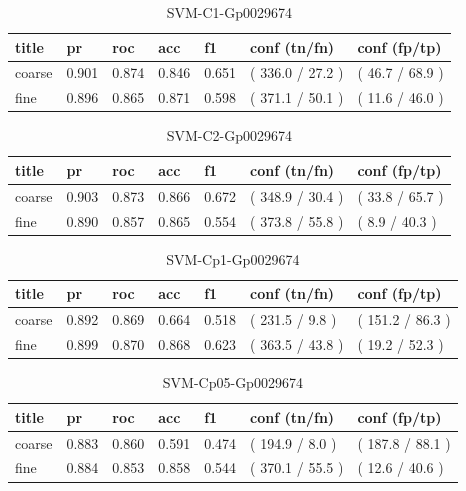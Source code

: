 \documentclass[ms]{nuthesis}
\begin{document}
\FloatBarrier
\begin{table}[H]
\centering
\begin{tabular}{|l||l||l||l||l||l||l|}\toprule
title & pr & roc & acc & f1 & conf (tn/fn) & conf (fp/tp) \\ \midrule
coarse & 0.901 & 0.874 & 0.846 & 0.651 & ( 336.0 / 27.2 ) & ( 46.7 / 68.9 ) \\
fine & 0.896 & 0.865 & 0.871 & 0.598 & ( 371.1 / 50.1 ) & ( 11.6 / 46.0 ) \\ \bottomrule
\end{tabular}
\caption{SVM-C1-Gp0029674}
\label{tab:SVM-C1-Gp0029674}
\end{table}
\FloatBarrier


\FloatBarrier
\begin{table}[H]
\centering
\begin{tabular}{|l||l||l||l||l||l||l|}\toprule
title & pr & roc & acc & f1 & conf (tn/fn) & conf (fp/tp) \\ \midrule
coarse & 0.903 & 0.873 & 0.866 & 0.672 & ( 348.9 / 30.4 ) & ( 33.8 / 65.7 ) \\
fine & 0.890 & 0.857 & 0.865 & 0.554 & ( 373.8 / 55.8 ) & ( 8.9 / 40.3 ) \\ \bottomrule
\end{tabular}
\caption{SVM-C2-Gp0029674}
\label{tab:SVM-C2-Gp0029674}
\end{table}
\FloatBarrier



\FloatBarrier
\begin{table}[H]
\centering
\begin{tabular}{|l||l||l||l||l||l||l|}\toprule
title & pr & roc & acc & f1 & conf (tn/fn) & conf (fp/tp) \\ \midrule
coarse & 0.892 & 0.869 & 0.664 & 0.518 & ( 231.5 / 9.8 ) & ( 151.2 / 86.3 ) \\
fine & 0.899 & 0.870 & 0.868 & 0.623 & ( 363.5 / 43.8 ) & ( 19.2 / 52.3 ) \\ \bottomrule
\end{tabular}
\caption{SVM-Cp1-Gp0029674}
\label{tab:SVM-Cp1-Gp0029674}
\end{table}
\FloatBarrier


\FloatBarrier
\begin{table}[H]
\centering
\begin{tabular}{|l||l||l||l||l||l||l|}\toprule
title & pr & roc & acc & f1 & conf (tn/fn) & conf (fp/tp) \\ \midrule
coarse & 0.883 & 0.860 & 0.591 & 0.474 & ( 194.9 / 8.0 ) & ( 187.8 / 88.1 ) \\
fine & 0.884 & 0.853 & 0.858 & 0.544 & ( 370.1 / 55.5 ) & ( 12.6 / 40.6 ) \\ \bottomrule
\end{tabular}
\caption{SVM-Cp05-Gp0029674}
\label{tab:SVM-Cp05-Gp0029674}
\end{table}
\FloatBarrier
\end{document}
